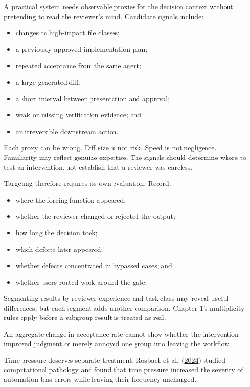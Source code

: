 
A practical system needs observable proxies for the decision context without pretending to read the reviewer's mind. Candidate signals include:

\begin{itemize}
\tightlist
\item
  changes to high-impact file classes;
\item
  a previously approved implementation plan;
\item
  repeated acceptance from the same agent;
\item
  a large generated diff;
\item
  a short interval between presentation and approval;
\item
  weak or missing verification evidence; and
\item
  an irreversible downstream action.
\end{itemize}

Each proxy can be wrong. Diff size is not risk. Speed is not negligence. Familiarity may reflect genuine expertise. The signals should determine where to test an intervention, not establish that a reviewer was careless.


Targeting therefore requires its own evaluation. Record:

\begin{itemize}
\tightlist
\item
  where the forcing function appeared;
\item
  whether the reviewer changed or rejected the output;
\item
  how long the decision took;
\item
  which defects later appeared;
\item
  whether defects concentrated in bypassed cases; and
\item
  whether users routed work around the gate.
\end{itemize}

Segmenting results by reviewer experience and task class may reveal useful differences, but each segment adds another comparison. Chapter 1's multiplicity rules apply before a subgroup result is treated as real.

An aggregate change in acceptance rate cannot show whether the intervention improved judgment or merely annoyed one group into leaving the workflow.

Time pressure deserves separate treatment. Rosbach et al.~(\href{https://arxiv.org/abs/2411.00998}{2024}) studied computational pathology and found that time pressure increased the severity of automation-bias errors while leaving their frequency unchanged.

